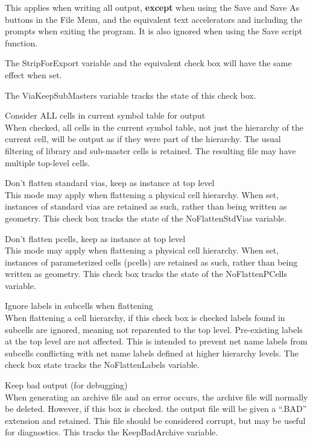 \begin{description}
This applies when writing all output, {\bf except} when using the {\cb
Save} and {\cb Save As} buttons in the {\cb File Menu}, and the
equivalent text accelerators and including the prompts when exiting
the program.  It is also ignored when using the {\vt Save} script
function.

The {\et StripForExport} variable and the equivalent check box will
have the same effect when set.

The {\et ViaKeepSubMasters} variable tracks the state of this check
box.

\item{\cb Consider ALL cells in current symbol table for output}\\
When checked, all cells in the current symbol table, not just the
hierarchy of the current cell, will be output as if they were part of
the hierarchy.  The usual filtering of library and sub-master cells is
retained.  The resulting file may have multiple top-level cells.

\item{\cb Don't flatten standard vias, keep as instance at top level}\\
This mode may apply when flattening a physical cell hierarchy.  When
set, instances of standard vias are retained as such, rather than
being written as geometry.  This check box tracks the state of the
{\et NoFlattenStdVias} variable.

\item{\cb Don't flatten pcells, keep as instance at top level}\\
This mode may apply when flattening a physical cell hierarchy.  When
set, instances of parameterized cells (pcells) are retained as such,
rather than being written as geometry.  This check box tracks the
state of the {\et NoFlattenPCells} variable.

\item{\cb Ignore labels in subcells when flattening}\\
When flattening a cell hierarchy, if this check box is checked labels
found in subcells are ignored, meaning not reparented to the top
level.  Pre-existing labels at the top level are not affected.  This
is intended to prevent net name labels from subcells conflicting with
net name labels defined at higher hierarchy levels.  The check box
state tracks the {\et NoFlattenLabels} variable.

\item{\cb Keep bad output (for debugging)}\\
When generating an archive file and an error occurs, the archive file
will normally be deleted.  However, if this box is checked.  the
output file will be given a ``{\vt .BAD}'' extension and retained. 
This file should be considered corrupt, but may be useful for
diagnostics.  This tracks the {\et KeepBadArchive} variable.
\end{description}

